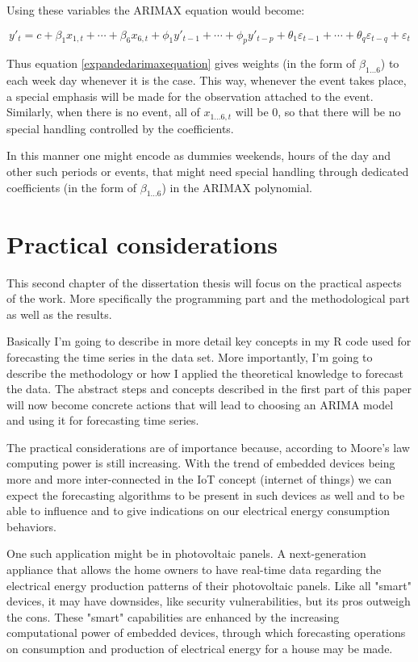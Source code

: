 \documentclass[12pt,a4paper,titlepage]{report}
\begin{document}
Using these variables the ARIMAX equation would become:

\begin{equation}
y'_{t} = c + \beta_{1} x_{1,t} + \cdots + \beta_{6} x_{6,t} + \phi_{1}y'_{t-1} + \cdots + \phi_{p}y'_{t-p} + \theta_{1}\varepsilon_{t-1} + \cdots + \theta_{q}\varepsilon_{t-q} + \varepsilon_{t} 
\label{expandedarimaxequation}
\end{equation}

Thus equation \ref{expandedarimaxequation} gives weights (in the form of $ \beta_{1\dots6} $) to each week day whenever it is the case. This way, whenever the event takes place, a special emphasis will be made for the observation attached to the event. Similarly, when there is no event, all of $ x_{1\dots6,t} $ will be 0, so that there will be no special handling controlled by the coefficients.

In this manner one might encode as dummies weekends, hours of the day and other such periods or events, that might need special handling through dedicated coefficients (in the form of $ \beta_{1\dots6} $) in the ARIMAX polynomial.

\newpage
\chapter{Practical considerations}
This second chapter of the dissertation thesis will focus on the practical aspects of the work. More specifically the programming part and the methodological part as well as the results.

Basically I'm going to describe in more detail key concepts in my R code used for forecasting the time series in the data set.
More importantly, I'm going to describe the methodology or how I applied the theoretical knowledge to forecast the data. The abstract steps and concepts described in the first part of this paper will now become concrete actions that will lead to choosing an ARIMA model and using it for forecasting time series.

The practical considerations are of importance because, according to Moore's law \cite{moore:1965} computing power is still increasing. 
With the trend of embedded devices being more and more inter-connected in the IoT concept (internet of things) we can expect the forecasting algorithms to be present in such devices as well and to be able to influence and to give indications on our electrical energy consumption behaviors.

One such application might be in photovoltaic panels. A next-generation appliance that allows the home owners to have real-time data regarding the electrical energy production patterns of their photovoltaic panels. Like all "smart" devices, it may have downsides, like security vulnerabilities, but its pros outweigh the cons. These "smart" capabilities are enhanced by the increasing computational power of embedded devices, through which forecasting operations on consumption and production of electrical energy for a house may be made.
\end{document}
